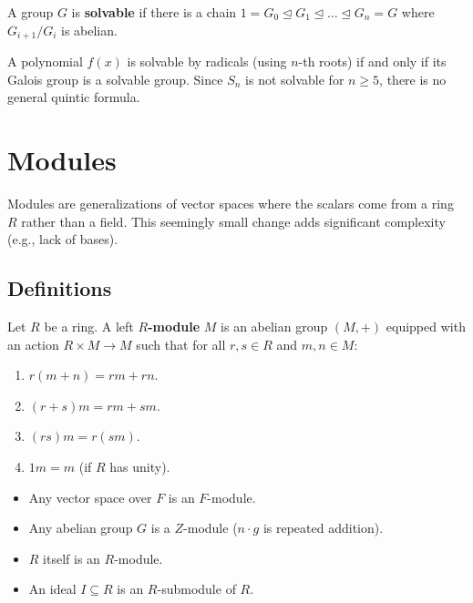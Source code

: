 \documentclass[oneside]{book}
\begin{document}
\begin{definition}
A group $G$ is \textbf{solvable} if there is a chain $1 = G_0 \trianglelefteq G_1 \trianglelefteq \dots \trianglelefteq G_n = G$ where $G_{i+1}/G_i$ is abelian.
\end{definition}

\begin{theorem}
A polynomial $f(x)$ is solvable by radicals (using $n$-th roots) if and only if its Galois group is a solvable group. Since $S_n$ is not solvable for $n \geq 5$, there is no general quintic formula.
\end{theorem}

\section{Modules}

Modules are generalizations of vector spaces where the scalars come from a ring $R$ rather than a field. This seemingly small change adds significant complexity (e.g., lack of bases).

\subsection{Definitions}

\begin{definition}[R-Module]
Let $R$ be a ring. A left \textbf{$R$-module} $M$ is an abelian group $(M, +)$ equipped with an action $R \times M \to M$ such that for all $r, s \in R$ and $m, n \in M$:
\begin{enumerate}
    \item $r(m+n) = rm + rn$.
    \item $(r+s)m = rm + sm$.
    \item $(rs)m = r(sm)$.
    \item $1m = m$ (if $R$ has unity).
\end{enumerate}
\end{definition}

\begin{example}
\begin{itemize}
    \item Any vector space over $F$ is an $F$-module.
    \item Any abelian group $G$ is a $Z$-module ($n \cdot g$ is repeated addition).
    \item $R$ itself is an $R$-module.
    \item An ideal $I \subseteq R$ is an $R$-submodule of $R$.
\end{itemize}
\end{example}
\end{document}
